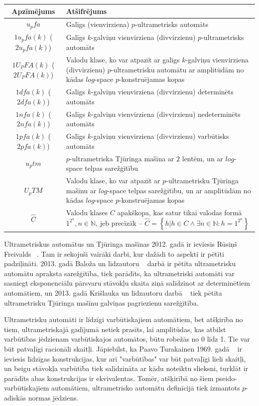 \documentclass{ludis}
\begin{document}
\setlength\LTleft{0pt}
\setlength\LTright{0pt}
\begin{longtable}{| c | p{28em} |}
  \hline
  \textbf{Apzīmējums} & \textbf{Atšifrējums}\\ 
  \endhead

  \hline
  $u_pfa$ & Galīgs (vienvirziena) $p$-ultrametrisks automāts\\
  $1u_pfa(k)$ ($2u_pfa(k)$) &  Galīgs $k$-galviņu vienvirziena (divvirzienu) $p$-ultrametrisks automāts\\
  $1U_PFA(k)$ ($2U_PFA(k)$) &  Valodu klase, ko var atpazīt ar galīgs $k$-galviņu vienvirziena (divvirzienu) $p$-ultrametrisku automātu ar amplitūdām no kādas $log$-space $p$-konstruējamas kopas\\
  $1dfa(k)$ ($2dfa(k)$) &  Galīgs $k$-galviņu vienvirziena (divvirzienu) determinēts automāts\\
  $1nfa(k)$ ($2nfa(k)$) &  Galīgs $k$-galviņu vienvirziena (divvirzienu) nedeterminēts automāts\\
  $1pfa(k)$ ($2pfa(k)$) &  Galīgs $k$-galviņu vienvirziena (divvirzienu) varbūtisks automāts\\
  $u_ptm$ &  $p$-ultrametriska Tjūringa mašīna ar $2$ lentēm, un ar $log$-space telpas sarežģītību\\
  $U_pTM$ &  Valodu klase, ko var atpazīt ar $p$-ultrametrisku Tjūringa mašīnu ar $log$-space telpas sarežģītību, un ar amplitūdām no kādas $log$-space $p$-konstruējamas kopas\\
  $\widehat{C}$ & Valodu klases $C$ apakškopa, kas satur tikai valodas formā $1^{2^n}, n \in \mathbb{N}$, jeb precīzāk -- $\widehat{C} = \left\{ h | h \in C \wedge \exists n \in \mathbb{N} : h = 1^{2^n} \right\}$\\
  \hline
\end{longtable}

Ultrametriskus automātus un Tjūringa mašīnas 2012. gadā ir ieviesis Rūsiņš Freivalds ~\citep{Freivalds2012}. Tam ir sekojuši vairāki darbi, kur dažādi to aspekti ir pētīti padziļināti. 2013. gadā Baloža un līdzautoru ~\citep{KasparsBalodis2013} darbā ir pētīta ultrametrisku automātu apraksta sarežģītība,
tiek parādīts, ka ultrametriski automāti var sasniegt eksponenciālu pārsvaru stāvokļu skaita ziņā salīdzinot ar determinētiem automātiem, un 2013. gadā Krišlauka un līdzautoru darbā ~\citep{Krislauks2013} tiek pētīta ultrametrisku Tjūringa mašīnu galviņas pagriezienu sarežģītība.

Ultrametrisku automāti ir līdzīgi varbūtiskajiem automātiem, bet atšķirība no tiem, ultrametriskajā gadījumā netiek prasīts, lai amplitūdas, kas atbilst varbūtības jēdzienam varbūtiskajos automātos, būtu robežās no 0 līdz 1. Tie var būt patvaļīgi racionāli skaitļi. Jāpiebilst, ka Paavo Turakainen 1969. gadā ~\citep{Turakainen1969} ir ieviesis līdzīgas konstrukcijas, kur arī "varbūtības" var būt patvaļīgi lieli skaitļi, un beigu stāvokļa varbūtība tiek salīdzināta ar kādu noteiktu slieksni, turklāt ir parādīts abas konstrukcijas ir ekvivalentas. Tomēr, atšķirībā no šiem pseido-varbūtiskajiem automātiem, ultrametrisko automātu definīcijā tiek izmantots $p$-adiskās normas jēdziens.
\end{document}
